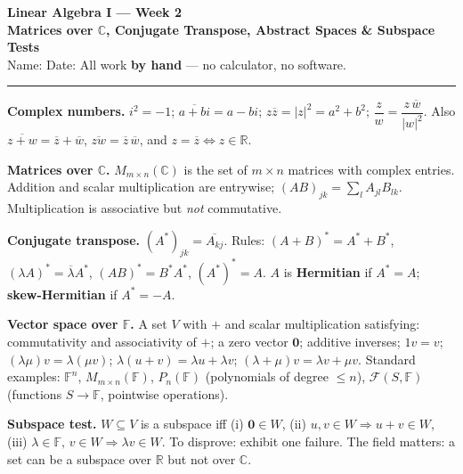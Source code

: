 \documentclass[11pt]{article}
\begin{document}
{\Large\bfseries\color{ink} Linear Algebra I --- Week 2}\\[2pt]
{\large\bfseries\color{ink} Matrices over $\mathbb{C}$, Conjugate Transpose, Abstract Spaces \& Subspace Tests}\\[3pt]
{\small Name: \underline{\hspace{5cm}}\hfill Date: \underline{\hspace{3cm}}\qquad All work \textbf{by hand} --- no calculator, no software.}
\vspace{4pt}\hrule\vspace{8pt}

\begin{tcolorbox}[colback=soft,colframe=ink,title={\bfseries Key Facts}]
\textbf{Complex numbers.} $i^{2}=-1$; $\overline{a+bi}=a-bi$; $z\overline z=|z|^{2}=a^{2}+b^{2}$; $\dfrac{z}{w}=\dfrac{z\,\overline w}{|w|^{2}}$. Also $\overline{z+w}=\overline z+\overline w$, $\overline{zw}=\overline z\,\overline w$, and $z=\overline z\iff z\in\mathbb{R}$.

\textbf{Matrices over $\mathbb{C}$.} $M_{m\times n}(\mathbb{C})$ is the set of $m\times n$ matrices with complex entries. Addition and scalar multiplication are entrywise; $(AB)_{jk}=\sum_{l}A_{jl}B_{lk}$. Multiplication is associative but \emph{not} commutative.

\textbf{Conjugate transpose.} $(A^{*})_{jk}=\overline{A_{kj}}$. Rules: $(A+B)^{*}=A^{*}+B^{*}$, $(\lambda A)^{*}=\overline{\lambda}A^{*}$, $(AB)^{*}=B^{*}A^{*}$, $(A^{*})^{*}=A$.
$A$ is \textbf{Hermitian} if $A^{*}=A$; \textbf{skew-Hermitian} if $A^{*}=-A$.

\textbf{Vector space over $\mathbb{F}$.} A set $V$ with $+$ and scalar multiplication satisfying: commutativity and associativity of $+$; a zero vector $\mathbf 0$; additive inverses; $1v=v$; $(\lambda\mu)v=\lambda(\mu v)$; $\lambda(u+v)=\lambda u+\lambda v$; $(\lambda+\mu)v=\lambda v+\mu v$.
Standard examples: $\mathbb{F}^{n}$, $M_{m\times n}(\mathbb{F})$, $P_{n}(\mathbb{F})$ (polynomials of degree $\le n$), $\mathcal F(S,\mathbb{F})$ (functions $S\to\mathbb{F}$, pointwise operations).

\textbf{Subspace test.} $W\subseteq V$ is a subspace iff (i) $\mathbf 0\in W$, (ii) $u,v\in W\Rightarrow u+v\in W$, (iii) $\lambda\in\mathbb{F},\,v\in W\Rightarrow\lambda v\in W$. To disprove: exhibit one failure. The field matters: a set can be a subspace over $\mathbb{R}$ but not over $\mathbb{C}$.
\end{tcolorbox}
\end{document}
